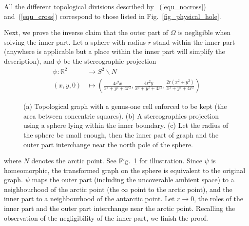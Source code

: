 \documentclass[journal]{IEEEtran}
\begin{document}
All the different topological divisions described by ~(\ref{equ_nocross}) and~(\ref{equ_cross}) correspond to those listed in Fig.~\ref{fig_physical_hole}.
 
Next, we prove the inverse claim that the outer part of $\Omega$ is negligible when solving the inner part.  
Let a sphere with radius $r$ stand within the inner part (anywhere is applicable but a place within the inner part will simplify the
 description), and $\psi$ be the stereographic projection%
\begin{equation}
\begin{aligned}
\psi: \mathbb{R}^2&\rightarrow S^2\backslash N\\
(x, y, 0)&\mapsto (\frac{4r^2x}{x^2 + y^2 + 4r^2}, \frac{4r^2y}{x^2 + y^2 + 4r^2}, \frac{2r(x^2 + y^2)}{x^2 + y^2 + 4r^2})
\end{aligned}
\end{equation}
\begin{figure}[t]
\centering
{}
\caption{ (a) Topological graph with a genus-one cell enforced to be kept (the area between concentric squares). 
(b) A stereographics projection using a sphere lying within the inner boundary. 
(c) Let the radius of the sphere be small enough, then the inner part of graph and the outer part interchange 
near the north pole of the sphere. }
\label{fig_stereographic_projection}
\end{figure}
where $N$ denotes the arctic point. See Fig.~\ref{fig_stereographic_projection} for illustration. Since $\psi$ is homeomorphic, 
the transformed graph on the sphere is equivalent to the original graph.  $\psi$ maps the outer part (including the uncoverable ambient 
space) to a neighbourhood of the arctic point (the $\infty$ point to the arctic point), and the inner part to a neighbourhood of the antarctic point. 
Let $r\rightarrow 0$, the roles of the inner part and the outer part interchange near the arctic point. 
Recalling the observation of the negligibility of the inner part, we finish the proof.
\end{document}
